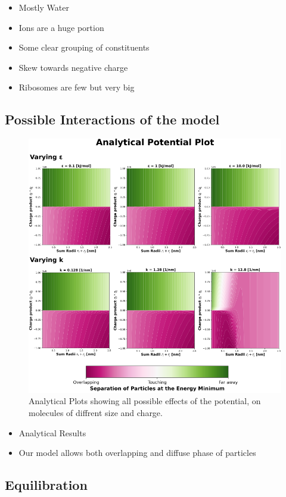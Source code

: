 \documentclass{article}
\begin{document}
\begin{itemize}
\item Mostly Water
\item Ions are a huge portion
\item Some clear grouping of constituents
\item Skew towards negative charge
\item Ribosomes are few but very big
\end{itemize}

\subsection{Possible Interactions of the model}

\begin{figure}[!htbp]
\centering
\includegraphics[width=0.7\linewidth]{files/Fig2-4a634fb40ba25fe916b6010c8907b16e.png}
\caption[]{Analytical Plots showing all possible effects of the potential, on molecules of diffrent size and charge.}
\label{Fig2_PotentialPlot}
\end{figure}

\begin{itemize}
\item Analytical Results
\end{itemize}

\begin{itemize}
\item Our model allows both overlapping and diffuse phase of particles
\end{itemize}

\subsection{Equilibration}
\end{document}
